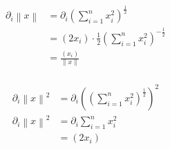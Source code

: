 \documentclass[sectionformat=aufgabe]{gadsescript}
\begin{document}
\maketitle
\begin{align*}
	\partial_i \left\| x \right\| &= \partial_i \left( \sum_{i=1}^{n} x_i^2 \right) ^{\frac{ 1 }{ 2 } }   \\
	~ &= \left( 2 x_i \right) \cdot \frac{ 1 }{ 2 } \left( \sum_{i=1}^{n} x_i^2 \right) ^{-\frac{ 1 }{ 2 } }   \\
	~ &= \frac{ \left( x_i \right) }{ \left\| x \right\| }   \\
\end{align*}

\begin{align*}
	\partial_i \left\| x \right\|^2 &= \partial_i \left( \left(\sum_{i=1}^{n} x_i^2\right)^{\frac{ 1 }{ 2 } } \right) ^2 \\
	\partial_i \left\| x \right\|^2 &= \partial_i \sum_{i=1}^{n} x_i^2 \\
	~ &= \left( 2 x_i \right)  \\
\end{align*}
\end{document}
